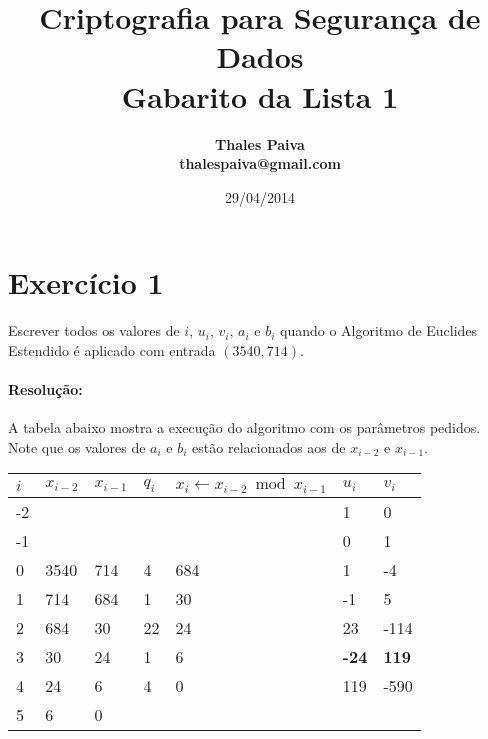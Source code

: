 \documentclass[a4paper,11pt]{article} %
\title{
	\textbf{
        Criptografia para Segurança de Dados \\
        Gabarito da Lista 1
    }
}
\author	{
	\bf{Thales Paiva}     \\
	thalespaiva@gmail.com       \\
}
\date{29/04/2014}
\begin{document}
\maketitle
\tableofcontents
\pagebreak

\section{Exercício 1}
\mbox{}

Escrever todos os valores de $ i $, $ u_i $, $ v_i $, $ a_i $ e $ b_i $  quando o Algoritmo de Euclides Estendido é aplicado com entrada $ (3540, 714) $.

\paragraph{Resolução:}
A tabela abaixo mostra a execução do algoritmo com os parâmetros pedidos. Note que os valores de $ a_i $ e $ b_i $ estão relacionados aos de $ x_{i-2} $ e $ x_{i-1} $.

\begin{table}[h]
\begin{tabular}{|l|l|l|l|l|l|l|}
\hline
\textbf{$ i $} & \textbf{$ x_{i-2} $} & \textbf{$ x_{i-1} $} & \textbf{$ q_i $} & \textbf{$ x_i \leftarrow x_{i-2} \bmod x_{i-1} $} & \textbf{$ u_{i} $} & \textbf{$ v_i $} \\ \hline
-2    &                      &                      &                  &                                                   & 1                  & 0                \\ \hline
-1             &                      &                      &                  &                                                   & 0                  & 1                \\ \hline
0              & 3540                 & 714                  & 4                & 684                                               & 1                  & -4               \\ \hline
1              & 714                  & 684                  & 1                & 30                                                & -1                 & 5                \\ \hline
2              & 684                  & 30                   & 22               & 24                                                & 23                 & -114             \\ \hline
3              & 30                   & 24                   & 1                & 6                                                 & \textbf{-24}       & \textbf{119}     \\ \hline
4              & 24                   & 6                    & 4                & 0                                                 & 119                & -590             \\ \hline
5              & 6           & 0                    &                  &                                                   &                    & \textbf{}        \\ \hline
\end{tabular}
\end{table}
\end{document}
